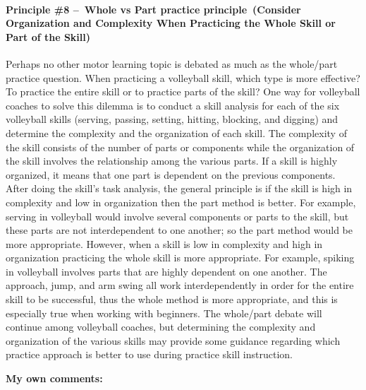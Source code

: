 \documentclass[
  letterpaper,
  DIV=11,
  numbers=noendperiod]{scrartcl}
\let\oldparagraph\paragraph
\renewcommand{\paragraph}[1]{\oldparagraph{#1}\mbox{}}
\begin{document}
\hypertarget{principle-8-whole-vs-part-practice-principle-consider-organization-and-complexity-when-practicing-the-whole-skill-or-part-of-the-skill}{%
\paragraph{\texorpdfstring{\textbf{Principle \#8 --~Whole vs Part
practice principle~(Consider Organization and Complexity When Practicing
the Whole Skill or Part of the
Skill)}}{Principle \#8 --~Whole vs Part practice principle~(Consider Organization and Complexity When Practicing the Whole Skill or Part of the Skill)}}\label{principle-8-whole-vs-part-practice-principle-consider-organization-and-complexity-when-practicing-the-whole-skill-or-part-of-the-skill}}

Perhaps no other motor learning topic is debated as much as the
whole/part practice question. When practicing a volleyball skill, which
type is more effective? To practice the entire skill or to practice
parts of the skill? One way for volleyball coaches to solve this dilemma
is to conduct a skill analysis for each of the six volleyball skills
(serving, passing, setting, hitting, blocking, and digging) and
determine the complexity and the organization of each skill. The
complexity of the skill consists of the number of parts or components
while the organization of the skill involves the relationship among the
various parts. If a skill is highly organized, it means that one part is
dependent on the previous components. After doing the skill's task
analysis, the general principle is if the skill is high in complexity
and low in organization then the part method is better. For example,
serving in volleyball would involve several components or parts to the
skill, but these parts are not interdependent to one another; so the
part method would be more appropriate. However, when a skill is low in
complexity and high in organization practicing the whole skill is more
appropriate. For example, spiking in volleyball involves parts that are
highly dependent on one another. The approach, jump, and arm swing all
work interdependently in order for the entire skill to be successful,
thus the whole method is more appropriate, and this is especially true
when working with beginners. The whole/part debate will continue among
volleyball coaches, but determining the complexity and organization of
the various skills may provide some guidance regarding which practice
approach is better to use during practice skill instruction.

\textbf{My own comments:}
\end{document}
